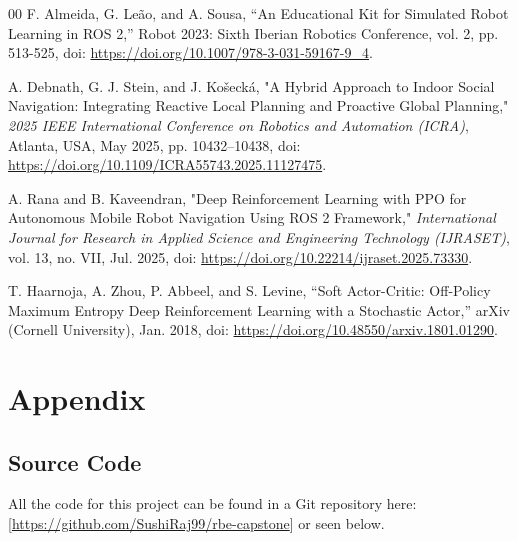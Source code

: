 \documentclass[conference]{IEEEtran}
\begin{document}
\begin{thebibliography}{00}
 F. Almeida, G. Le\~{a}o, and A. Sousa, “An Educational Kit for Simulated Robot Learning in ROS 2,” Robot 2023: Sixth Iberian Robotics Conference, vol. 2, pp. 513-525, doi: \url{https://doi.org/10.1007/978-3-031-59167-9_4}.

 A. Debnath, G. J. Stein, and J. Ko\v{s}eck\'{a}, "A Hybrid Approach to Indoor Social Navigation: Integrating Reactive Local Planning and Proactive Global Planning," \textit{2025 IEEE International Conference on Robotics and Automation (ICRA)}, Atlanta, USA, May 2025, pp. 10432--10438, doi: \url{https://doi.org/10.1109/ICRA55743.2025.11127475}.

 A. Rana and B. Kaveendran, "Deep Reinforcement Learning with PPO for Autonomous Mobile Robot Navigation Using ROS 2 Framework," \textit{International Journal for Research in Applied Science and Engineering Technology (IJRASET)}, vol. 13, no. VII, Jul. 2025, doi: \url{https://doi.org/10.22214/ijraset.2025.73330}.

 T. Haarnoja, A. Zhou, P. Abbeel, and S. Levine, “Soft Actor-Critic: Off-Policy Maximum Entropy Deep Reinforcement Learning with a Stochastic Actor,” arXiv (Cornell University), Jan. 2018, doi: \url{https://doi.org/10.48550/arxiv.1801.01290}.

\end{thebibliography}


\newpage
\onecolumn
\appendix
\section{Appendix}
  \subsection{Source Code}
    All the code for this project can be found in a Git repository here: [\url{https://github.com/SushiRaj99/rbe-capstone}] or seen below.
    \clearpage
    \newpage
\end{document}
